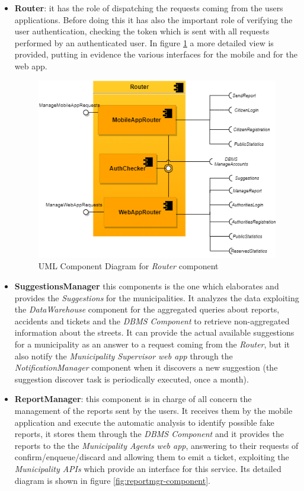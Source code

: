 \documentclass[a4paper]{report}
\begin{document}
\begin{itemize}
\item \textbf{Router}: it has the role of dispatching the requests coming from the users applications. Before doing this it has also the important role of verifying the user authentication, checking the token which is sent with all requests performed by an authenticated user. In figure \ref{fig:router-component} a more detailed view is provided, putting in evidence the various interfaces for the mobile and for the web app.
\begin{figure}[hp]
\includegraphics[width=\textwidth]{Router}
\caption{UML Component Diagram for \textit{Router} component}
\label{fig:router-component}
\end{figure}
\item \textbf{SuggestionsManager} this components is the one which elaborates and provides the \textit{Suggestions} for the municipalities. It analyzes the data exploiting the \textit{DataWarehouse} component for the aggregated queries about reports, accidents and tickets and the \textit{DBMS Component} to retrieve non-aggregated information about the streets. It can provide the actual available suggestions for a municipality as an answer to a request coming from the \textit{Router}, but it also notify the \textit{Municipality Supervisor web app} through the \textit{NotificationManager} component when it discovers a new suggestion (the suggestion discover task is periodically executed, once a month).
\item \textbf{ReportManager}: this component is in charge of all concern the management of the reports sent by the users. It receives them by the mobile application and execute the automatic analysis to identify possible fake reports, it stores them through the \textit{DBMS Component} and it provides the reports to the the \textit{Municipality Agents web app}, answering to their requests of confirm/enqueue/discard and allowing them to emit a ticket, exploiting the \textit{Municipality APIs} which provide an interface for this service. Its detailed diagram is shown in figure \ref{fig:reportmgr-component}.


\end{itemize}
\end{document}
